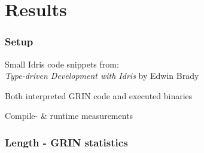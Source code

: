 \documentclass[bigger]{beamer}
\begin{document}
\section{Results}

\begin{frame}[fragile]
\frametitle{Setup}

	\vspace{1.5cm}
	\begin{vfitemize}
		\item Small Idris code snippets from: \\
		\textit{Type-driven Development with Idris} by Edwin Brady
		\item Both interpreted GRIN code and executed binaries
		\item Compile- \& runtime measurements
	\end{vfitemize}

	\vspace{-0.5cm}
	\begin{figure}[H] 
		\centering
		\begin{adjustbox}{scale = 0.75}
			
		\end{adjustbox}
	\end{figure}

\end{frame}



\begin{frame}[fragile]
\frametitle{Length - GRIN statistics}
	
	\begin{figure}
		\hspace{-1cm}
		\begin{minipage}{0.45\textwidth}
		\end{minipage}
		\hspace{1cm}
		\begin{minipage}{0.45\textwidth}
		\end{minipage}
	\end{figure}
	
\end{frame}
\end{document}
